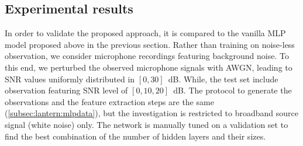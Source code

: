 \subsection{Experimental results}
In order to validate the proposed approach, it is compared to the vanilla \ac{MLP} model proposed above in the previous section.
Rather than training on noise-less observation, we consider microphone recordings featuring background noise.
To this end, we perturbed the observed microphone signals with \ac{AWGN}, leading to \ac{SNR} values uniformly distributed in $[0, 30]$~dB.
While, the test set include observation featuring \ac{SNR} level of $[0, 10, 20]$~dB.
The protocol to generate the observations and the feature extraction steps are the same (\cref{subsec:lantern:mlpdata}), but the investigation is restricted to broadband source signal (white noise) only.
The network is manually tuned on a validation set to find the best combination of the number of hidden layers and their sizes.

